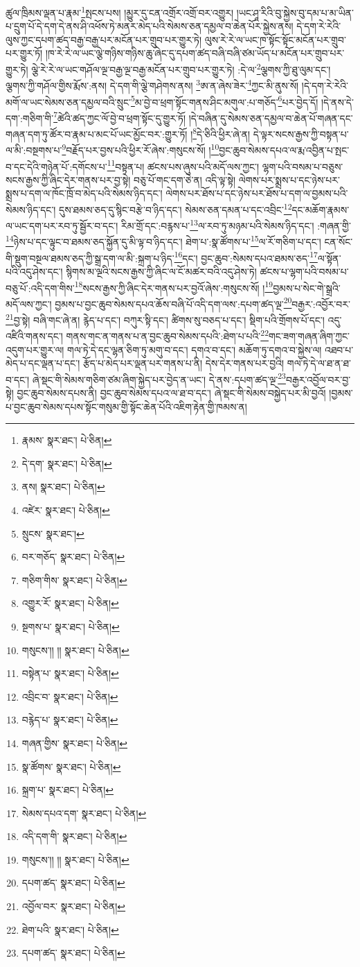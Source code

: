 ཚུལ་ཁྲིམས་ལྡན་པ་རྣམ་\footnote{རྣམས་  སྣར་ཐང་།  པེ་ཅིན། }སྤངས་པས། །མྱུར་དུ་ངན་འགྲོར་འགྲོ་བར་འགྱུར། །ཡང་ཤཱ་རིའི་བུ་སྐྱེས་བུ་དམ་པ་མ་ཡིན་པ་དྲུག་པོ་དེ་དག་དེ་ནས་ཤི་འཕོས་ཏེ་མནར་མེད་པའི་སེམས་ཅན་དམྱལ་བ་ཆེན་པོར་སྐྱེས་ནས། དེ་དག་རེ་རེའི་ལུས་ཀྱང་དཔག་ཚད་བརྒྱ་བརྒྱ་པར་མངོན་པར་གྲུབ་པར་གྱུར་ཏེ། ལུས་རེ་རེ་ལ་ཡང་ཁ་སྟོང་སྟོང་མངོན་པར་གྲུབ་པར་གྱུར་ཏོ། །ཁ་རེ་རེ་ལ་ཡང་ལྕེ་གཉིས་གཉིས་ཆུ་ཞེང་དུ་དཔག་ཚད་བཞི་བཞི་ཙམ་ཡོད་པ་མངོན་པར་གྲུབ་པར་གྱུར་ཏེ། ལྕེ་རེ་རེ་ལ་ཡང་གཤོལ་ལྔ་བརྒྱ་ལྔ་བརྒྱ་མངོན་པར་གྲུབ་པར་གྱུར་ཏེ། :དེ་ལ་\footnote{དེ་དག་  སྣར་ཐང་།  པེ་ཅིན། }ལྕགས་ཀྱི་ཐུ་ལུམ་དང་། ལྕགས་ཀྱི་གཤོལ་གྱིས་རྨོས་:ནས། དེ་དག་གི་ལྕེ་གཤེགས་ནས། \footnote{ནས།    སྣར་ཐང་།  པེ་ཅིན། }ཨ་ན་ཞེས་ཟེར་\footnote{འཛེར་  སྣར་ཐང་།  པེ་ཅིན། }ཀྱང་མི་ནུས་སོ། །དེ་དག་རེ་རེའི་མགོ་ལ་ཡང་སེམས་ཅན་དམྱལ་བའི་སྲུང་\footnote{སྲུངས་  སྣར་ཐང་། }མ་བྱེ་བ་ཕྲག་སྟོང་གནས་ཤིང་མགུལ་:པ་གཅོད་\footnote{བར་གཅོད་  སྣར་ཐང་།  པེ་ཅིན། }པར་བྱེད་དོ། །དེ་ནས་དེ་དག་:གཅིག་གི་\footnote{གཅིག་གིས་  སྣར་ཐང་།  པེ་ཅིན། }ཚེའི་ཚད་ཀྱང་ལོ་བྱེ་བ་ཕྲག་སྟོང་དུ་གྱུར་ཏོ། །དེ་བཞིན་དུ་སེམས་ཅན་དམྱལ་བ་ཆེན་པོ་གཞན་དང་གཞན་དག་ཏུ་ཚོར་བ་རྣམ་པ་མང་པོ་ཡང་མྱོང་བར་:གྱུར་ཏོ། །\footnote{འགྱུར་རོ་  སྣར་ཐང་།  པེ་ཅིན། }དེ་ཅིའི་ཕྱིར་ཞེ་ན། དེ་ལྟར་སངས་རྒྱས་ཀྱི་བསྟན་པ་ལ་མི་:བསྔགས་པ་\footnote{སྔགས་པ་  སྣར་ཐང་།  པེ་ཅིན། }བརྗོད་པར་བྱས་པའི་ཕྱིར་རོ་ཞེས་:གསུངས་སོ། །\footnote{གསུངས་།། །།  སྣར་ཐང་།  པེ་ཅིན། }བྱང་ཆུབ་སེམས་དཔའ་ལ་རྨ་འབྱིན་པ་སྤང་བ་དང་དེའི་གཉེན་པོ་:དགོངས་པ་\footnote{བསྟེན་པ་  སྣར་ཐང་།  པེ་ཅིན། }བསྟན་པ། ཚངས་པས་ཞུས་པའི་མདོ་ལས་ཀྱང་། ལྷག་པའི་བསམ་པ་བཅུས་སངས་རྒྱས་ཀྱི་ཞིང་དེར་གནས་པར་བྱ་སྟེ། བཅུ་པོ་གང་དག་ཅེ་ན། འདི་ལྟ་སྟེ། ལེགས་པར་སྨྲས་པ་དང་ཉེས་པར་སྨྲས་པ་དག་ལ་ཁོང་ཁྲོ་བ་མེད་པའི་སེམས་ཉིད་དང་། ལེགས་པར་ཐོས་པ་དང་ཉེས་པར་ཐོས་པ་དག་ལ་བྱམས་པའི་སེམས་ཉིད་དང་། དུས་ཐམས་ཅད་དུ་སྙིང་བརྩེ་བ་ཉིད་དང་། སེམས་ཅན་དམན་པ་དང་འབྲིང་\footnote{འབྲིང་བ་  སྣར་ཐང་།  པེ་ཅིན། }དང་མཆོག་རྣམས་ལ་ཡང་དག་པར་རབ་ཏུ་སྦྱོར་བ་དང་། རིམ་གྲོ་དང་:བརྙས་པ་\footnote{བརྙེད་པ་  སྣར་ཐང་།  པེ་ཅིན། }ལ་རབ་ཏུ་མཉམ་པའི་སེམས་ཉིད་དང་། :གཞན་གྱི་\footnote{གཞན་གྱིས་  སྣར་ཐང་།  པེ་ཅིན། }ཉེས་པ་དང་ལྟུང་བ་ཐམས་ཅད་སྐྱོན་དུ་མི་ལྟ་བ་ཉིད་དང་། ཐེག་པ་:སྣ་ཚོགས་པ་\footnote{སྣ་ཚོགས་  སྣར་ཐང་།  པེ་ཅིན། }ལ་རོ་གཅིག་པ་དང་། ངན་སོང་གི་སྡུག་བསྔལ་ཐམས་ཅད་ཀྱི་སྒྲ་དག་ལ་མི་:སྐྲག་པ་ཉིད་\footnote{སྐྲག་པ་  སྣར་ཐང་།  པེ་ཅིན། }དང་། བྱང་ཆུབ་:སེམས་དཔའ་ཐམས་ཅད་\footnote{སེམས་དཔའ་དག་  སྣར་ཐང་།  པེ་ཅིན། }ལ་སྟོན་པའི་འདུ་ཤེས་དང་། སྙིགས་མ་ལྔའི་སངས་རྒྱས་ཀྱི་ཞིང་ལ་ངོ་མཚར་བའི་འདུ་ཤེས་ཏེ། ཚངས་པ་ལྷག་པའི་བསམ་པ་བཅུ་པོ་:འདི་དག་གིས་\footnote{འདི་དག་གི་  སྣར་ཐང་།  པེ་ཅིན། }སངས་རྒྱས་ཀྱི་ཞིང་དེར་གནས་པར་བྱའོ་ཞེས་:གསུངས་སོ། །\footnote{གསུངས་།། །།  སྣར་ཐང་།  པེ་ཅིན། }བྱམས་པ་སེང་གེ་སྒྲའི་མདོ་ལས་ཀྱང་། བྱམས་པ་བྱང་ཆུབ་སེམས་དཔའ་ཆོས་བཞི་པོ་འདི་དག་ལས་:དཔག་ཚད་ལྔ་\footnote{དཔག་ཚད་  སྣར་ཐང་།  པེ་ཅིན། }བརྒྱར་:འབྱོར་བར་\footnote{འབྱོལ་བར་  སྣར་ཐང་།  པེ་ཅིན། }བྱ་སྟེ། བཞི་གང་ཞེ་ན། རྙེད་པ་དང་། བཀུར་སྟི་དང་། ཚིགས་སུ་བཅད་པ་དང་། སྡིག་པའི་གྲོགས་པོ་དང་། འདུ་འཛིའི་གནས་དང་། གནས་གང་ན་གནས་པ་ན་བྱང་ཆུབ་སེམས་དཔའི་:ཐེག་པ་པའི་\footnote{ཐེག་པའི་  སྣར་ཐང་།  པེ་ཅིན། }གང་ཟག་གཞན་ཞིག་ཀྱང་འདུག་པར་གྱུར་ལ། གལ་ཏེ་དེ་དང་ལྷན་ཅིག་ཏུ་མགུ་བ་དང་། དགའ་བ་དང་། མཆོག་ཏུ་དགའ་བ་སྐྱེས་ལ། འཐབ་པ་མེད་པ་དང་ལྡན་པ་དང་། རྩོད་པ་མེད་པར་ལྡན་པར་གནས་པ་ནི། དེས་དེར་གནས་པར་བྱའི། གལ་ཏེ་དེ་ལ་ཐ་ན་ཐ་བ་དང་། ཞེ་སྡང་གི་སེམས་གཅིག་ཙམ་ཞིག་སྐྱེད་པར་བྱེད་ན་ཡང་། དེ་ནས་:དཔག་ཚད་ལྔ་\footnote{དཔག་ཚད་  སྣར་ཐང་།  པེ་ཅིན། }བརྒྱར་འབྱོལ་བར་བྱ་སྟེ། བྱང་ཆུབ་སེམས་དཔས་ནི། བྱང་ཆུབ་སེམས་དཔའ་ལ་ཐ་བ་དང་། ཞེ་སྡང་གི་སེམས་བསྐྱེད་པར་མི་བྱའོ། །བྱམས་པ་བྱང་ཆུབ་སེམས་དཔས་སྟོང་གསུམ་གྱི་སྟོང་ཆེན་པོའི་འཇིག་རྟེན་གྱི་ཁམས་ན། 